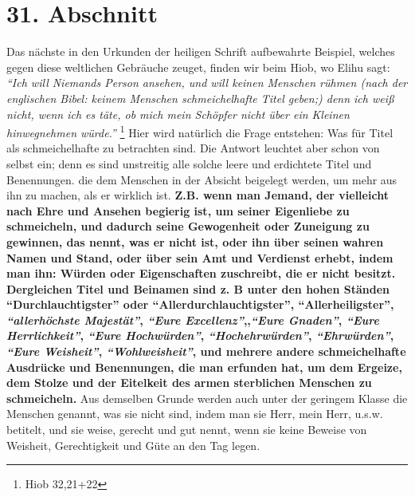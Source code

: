 \section{31. Abschnitt} \label{kap9_ab31}

Das nächste in den Urkunden der heiligen Schrift aufbewahrte Beispiel, welches
gegen diese weltlichen Gebräuche zeuget, finden wir beim Hiob, wo
Elihu sagt:
\textit{"`Ich will Niemands Person ansehen, und will keinen Menschen rühmen
(nach der
englischen Bibel: keinem Menschen schmeichelhafte Titel geben;) denn ich weiß
nicht, wenn ich es täte, ob mich mein Schöpfer nicht über ein Kleinen
hinwegnehmen würde."'}
\footnote{Hiob 32,21+22}
Hier wird natürlich die Frage
entstehen: Was für Titel als schmeichelhafte zu betrachten sind. Die Antwort
leuchtet aber schon von selbst ein; denn es sind unstreitig alle solche leere
und erdichtete Titel und Benennungen. die dem Menschen in der Absicht beigelegt
werden, um mehr aus ihn zu machen, als er wirklich ist.
\label{ref:09_31_heuchelei} \textbf{Z.B. wenn man Jemand,
der vielleicht nach Ehre und Ansehen begierig ist, um seiner
Eigenliebe zu
schmeicheln, und dadurch seine Gewogenheit oder Zuneigung zu gewinnen, das
nennt, was er nicht ist, oder ihn über seinen wahren Namen und Stand, oder über
sein Amt und Verdienst erhebt, indem man ihn: Würden oder Eigenschaften
zuschreibt, die er nicht besitzt. Dergleichen Titel und Beinamen sind z. B unter
den hohen Ständen "`Durchlauchtigster"' oder "`Allerdurchlauchtigster"',
"`Allerheiligster"', \textit{"`allerhöchste Majestät"'}, \textit{"`Eure
Excellenz"'},,\textit{"`Eure
Gnaden"'}, \textit{"`Eure Herrlichkeit"'}, \textit{"`Eure Hochwürden"'},
\textit{"`Hochehrwürden"'},
\textit{"`Ehrwürden"'}, \textit{"`Eure Weisheit"'}, \textit{"`Wohlweisheit"'},
und mehrere andere
schmeichelhafte Ausdrücke und Benennungen, die man erfunden hat, um dem Ergeize,
dem Stolze und der Eitelkeit des armen sterblichen Menschen zu schmeicheln.}
Aus demselben Grunde werden auch unter der geringem Klasse die Menschen
genannt, was sie nicht sind, indem man sie Herr, mein Herr, u.s.w. betitelt,
und sie weise, gerecht und gut nennt, wenn sie keine Beweise von Weisheit,
Gerechtigkeit und Güte an den Tag legen.

\medskip

